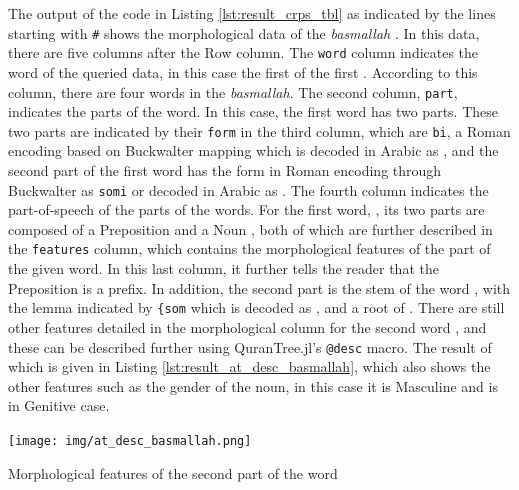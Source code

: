 The output of the code in Listing \ref{lst:result_crps_tbl} as indicated by the lines starting with \texttt{\#} shows the morphological data of the \textit{basmallah} . In this data, there are five columns after the Row column. The \texttt{word} column indicates the word of the queried data, in this case the first   of the first  . According to this column, there are four words in the \textit{basmallah}. The second column, \texttt{part}, indicates the parts of the word. In this case, the first word has two parts. These two parts are indicated by their \texttt{form} in the third column, which are \texttt{bi}, a Roman encoding based on Buckwalter \cite{buckwalter2002} mapping which is decoded in Arabic as , and the second part of the first word has the form in Roman encoding through Buckwalter as \texttt{somi} or decoded in Arabic as  . The fourth column indicates the part-of-speech of the parts of the words. For the first word,  , its two parts are composed of a Preposition   and a Noun  , both of which are further described in the \texttt{features} column, which contains the morphological features of the part of the given word. In this last column, it further tells the reader that the Preposition   is a prefix. In addition, the second part   is the stem of the word , with the lemma indicated by \texttt{\{som} which is decoded as  , and a root of  . There are still other features detailed in the morphological column for the second word  , and these can be described further using QuranTree.jl's \texttt{@desc} macro. The result of which is given in Listing \ref{lst:result_at_desc_basmallah}, which also shows the other features such as the gender of the noun, in this case it is Masculine and is in Genitive case.

\begin{listing2}[!t]
    \centering
    \texttt{[image: img/at\_desc\_basmallah.png]}
    \caption{Morphological features of the second part of the word  }
    \label{lst:result_at_desc_basmallah}
\end{listing2}

